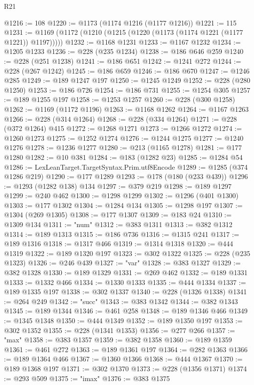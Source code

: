 \begin{lexlean}{R21}
\begin{coremodule}
@1216 := 108
@1220 := @1173 (@1174 @1216 (@1177 @1216))
@1221 := 115
@1231 := @1169 (@1172 (@1210 (@1215 (@1220 (@1173 (@1174 @1221 (@1177 @1221)) @1197)))))
@1232 := @1168 @1231
@1233 := @1167 @1232
@1234 := @1205 @1233
@1236 := @228 (@235 @1234)
@1238 := @186 @646 @259
@1240 := @228 (@251 @1238)
@1241 := @186 @651
@1242 := @1241 @272
@1244 := @228 (@267 @1242)
@1245 := @186 @659
@1246 := @186 @670
@1247 := @1246 @285
@1249 := @189 @1247 @197
@1250 := @1245 @1249
@1252 := @228 (@280 @1250)
@1253 := @186 @726
@1254 := @186 @731
@1255 := @1254 @305
@1257 := @189 @1255 @197
@1258 := @1253 @1257
@1260 := @228 (@300 @1258)
@1262 := @1169 (@1172 @1196)
@1263 := @1168 @1262
@1264 := @1167 @1263
@1266 := @228 (@314 @1264)
@1268 := @228 (@334 @1264)
@1271 := @228 (@372 @1264) @415
@1272 := @1268 @1271
@1273 := @1266 @1272
@1274 := @1260 @1273
@1275 := @1252 @1274
@1276 := @1244 @1275
@1277 := @1240 @1276
@1278 := @1236 @1277
@1280 := @213 (@1165 @1278)
@1281 := @177 @1280
@1282 := @10 @381
@1284 := @183 (@1282 @23)
@1285 := @1284 @54
@1286 := LexLeanTarget.TargetSyntax.Prim.utf8Encode
@1289 := @1285 (@374 @1286 @219)
@1290 := @177 @1289
@1293 := @178 (@180 (@233 @439))
@1296 := @1293 (@1282 @138) @134
@1297 := @379 @219
@1298 := @189 @1297
@1299 := @240 @462
@1300 := @1298 @1299
@1302 := @1296 (@401 @1300)
@1303 := @177 @1302
@1304 := @1284 @134
@1305 := @1298 @197
@1307 := @1304 (@269 @1305)
@1308 := @177 @1307
@1309 := @183 @24
@1310 := @1309 @134
@1311 := "num"
@1312 := @383 @1311
@1313 := @382 @1312
@1314 := @189 @1313
@1315 := @186 @736
@1316 := @1315 @241
@1317 := @189 @1316
@1318 := @1317 @466
@1319 := @1314 @1318
@1320 := @444 @1319
@1322 := @189 @1320 @197
@1323 := @302 @1322
@1325 := @228 (@235 @1323)
@1326 := @246 @439
@1327 := "var"
@1328 := @383 @1327
@1329 := @382 @1328
@1330 := @189 @1329
@1331 := @269 @462
@1332 := @189 @1331
@1333 := @1332 @466
@1334 := @1330 @1333
@1335 := @444 @1334
@1337 := @189 @1335 @197
@1338 := @302 @1337
@1340 := @228 (@1326 @1338)
@1341 := @264 @249
@1342 := "succ"
@1343 := @383 @1342
@1344 := @382 @1343
@1345 := @189 @1344
@1346 := @461 @258
@1348 := @189 @1346 @466
@1349 := @1345 @1348
@1350 := @444 @1349
@1352 := @189 @1350 @197
@1353 := @302 @1352
@1355 := @228 (@1341 @1353)
@1356 := @277 @266
@1357 := "max"
@1358 := @383 @1357
@1359 := @382 @1358
@1360 := @189 @1359
@1361 := @461 @272
@1363 := @189 @1361 @197
@1364 := @282 @1363
@1366 := @189 @1364 @466
@1367 := @1360 @1366
@1368 := @444 @1367
@1370 := @189 @1368 @197
@1371 := @302 @1370
@1373 := @228 (@1356 @1371)
@1374 := @293 @509
@1375 := "imax"
@1376 := @383 @1375

\end{coremodule}
\end{lexlean}
